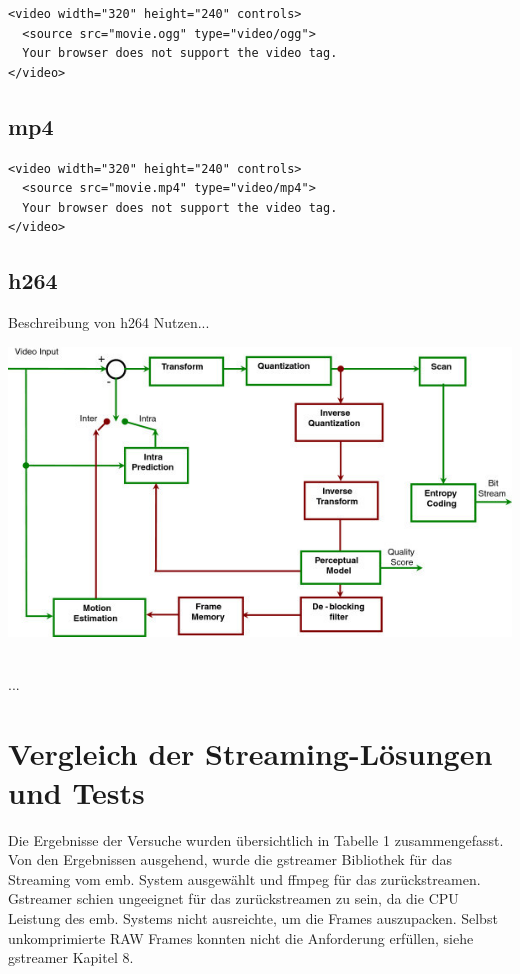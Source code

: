 \begin{verbatim}
<video width="320" height="240" controls>
  <source src="movie.ogg" type="video/ogg">
  Your browser does not support the video tag.
</video> 
\end{verbatim}

\subsection{mp4}

\begin{verbatim}
<video width="320" height="240" controls>
  <source src="movie.mp4" type="video/mp4">
  Your browser does not support the video tag.
</video> 
\end{verbatim}

\subsection{h264}

Beschreibung von h264 Nutzen...

\begin{minipage}{\textwidth}
    \begin{center}
        \includegraphics[scale=4.0]{img/h264.jpg} 
    \end{center}
\end{minipage}\\

...

\section{Vergleich der Streaming-Lösungen und Tests}
Die Ergebnisse der Versuche wurden übersichtlich in Tabelle 1 zusammengefasst. Von den Ergebnissen ausgehend, wurde die gstreamer Bibliothek für das Streaming vom emb. System ausgewählt und ffmpeg für das zurückstreamen. Gstreamer schien ungeeignet für das zurückstreamen zu sein, da die CPU Leistung des emb. Systems nicht ausreichte, um die Frames auszupacken. Selbst unkomprimierte RAW Frames konnten nicht die Anforderung erfüllen, siehe gstreamer Kapitel 8.

